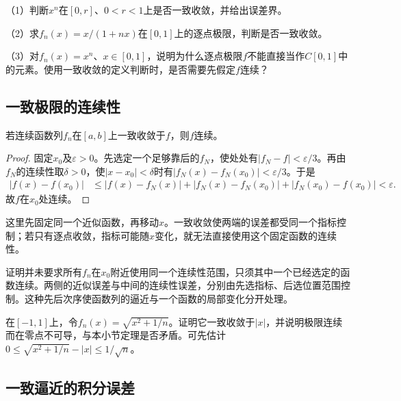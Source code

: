 \begin{exercise}
\mbox{}\par\nobreak

（1）判断\(x^n\)在\([0,r]\)、\(0<r<1\)上是否一致收敛，并给出误差界。

（2）求\(f_n(x)=x/(1+nx)\)在\([0,1]\)上的逐点极限，判断是否一致收敛。

（3）对\(f_n(x)=x^n\)、\(x\in[0,1]\)，说明为什么逐点极限\(f\)不能直接当作\(C[0,1]\)中的元素。使用一致收敛的定义判断时，是否需要先假定\(f\)连续？
\end{exercise}

\subsection{一致极限的连续性}

\begin{theorem}\label{thm:calculus-uniform-limit-continuity}
若连续函数列\(f_n\)在\([a,b]\)上一致收敛于\(f\)，则\(f\)连续。
\end{theorem}

\begin{proof}
固定\(x_0\)及\(\varepsilon>0\)。先选定一个足够靠后的\(f_N\)，使处处有\(|f_N-f|<\varepsilon/3\)。再由\(f_N\)的连续性取\(\delta>0\)，使\(|x-x_0|<\delta\)时有\(|f_N(x)-f_N(x_0)|<\varepsilon/3\)。于是
\begin{equation*}
 \begin{aligned}
 |f(x)-f(x_0)|&\le|f(x)-f_N(x)|+|f_N(x)-f_N(x_0)|+|f_N(x_0)-f(x_0)|<\varepsilon.
 \end{aligned}
\end{equation*}
故\(f\)在\(x_0\)处连续。
\end{proof}

这里先固定同一个近似函数，再移动\(x\)。一致收敛使两端的误差都受同一个指标控制；若只有逐点收敛，指标可能随\(x\)变化，就无法直接使用这个固定函数的连续性。

证明并未要求所有\(f_n\)在\(x_0\)附近使用同一个连续性范围，只须其中一个已经选定的函数连续。两侧的近似误差与中间的连续性误差，分别由先选指标、后选位置范围控制。这种先后次序使函数列的逼近与一个函数的局部变化分开处理。

\begin{example}
在\([-1,1]\)上，令\(f_n(x)=\sqrt{x^2+1/n}\)。证明它一致收敛于\(|x|\)，并说明极限连续而在零点不可导，与本小节定理是否矛盾。可先估计\(0\le\sqrt{x^2+1/n}-|x|\le1/\sqrt n\)。
\end{example}

\subsection{一致逼近的积分误差}

